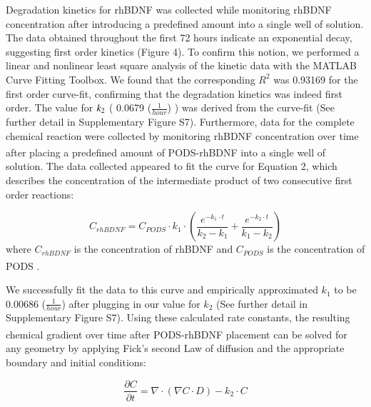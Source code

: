 \documentclass[review]{elsarticle}
\begin{document}
Degradation kinetics for rhBDNF was collected while monitoring rhBDNF concentration after introducing a predefined amount into a single well of solution. The data obtained throughout the first 72 hours indicate an exponential decay, suggesting first order kinetics (Figure 4). To confirm this notion, we performed a linear and nonlinear least square analysis of the kinetic data with the MATLAB Curve Fitting Toolbox. We found that the corresponding $R^{2}$ was 0.93169 for the first order curve-fit, confirming that the degradation kinetics was indeed first order. The value for $k\textsubscript{2}$ ( 0.0679 ($\frac{1}{hour}$) ) was derived from the curve-fit (See further detail in Supplementary Figure S7). Furthermore, data for the complete chemical reaction were collected by monitoring rhBDNF concentration over time after placing a predefined amount of PODS\textsuperscript{\textregistered}-rhBDNF into a single well of solution. The data collected appeared to fit the curve for Equation 2, which describes the concentration of the intermediate product of two consecutive first order reactions:  

\begin{equation}
C_{rhBDNF} =  C_{PODS} \cdot k_1 \cdot (\frac{e^{-k_1 \cdot t}}{ k_2-  k_1}  + \frac{e^{-k_2 \cdot t}}{ k_1 -  k_2} )
\end{equation}
where $C_{rhBDNF}$ is the concentration of rhBDNF and $C_{PODS}$ is the concentration of PODS\textsuperscript{\textregistered} \cite{levenspiel1999}.

 We successfully fit the data to this curve and empirically approximated $k_{1}$ to be 0.00686 ($\frac{1}{hour}$) after plugging in our value for $k_{2}$ (See further detail in Supplementary Figure S7).  Using these calculated rate constants, the resulting chemical gradient over time after PODS\textsuperscript{\textregistered}-rhBDNF placement can be solved for any geometry by applying Fick’s second Law of diffusion and the appropriate boundary and initial conditions: 


\begin{equation}
\renewcommand{\vec}[1]{\boldsymbol{#1}}
\frac{\partial C}{\partial t}
= \nabla\cdot\left(\nabla C\cdot D\right)-k_{2}\cdot C
\end{equation}
\end{document}
